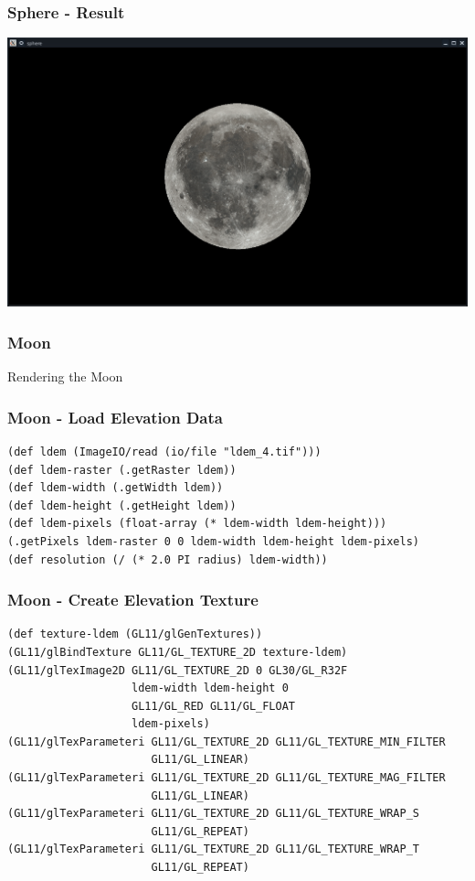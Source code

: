 \documentclass[aspectratio=169,11pt,xcolor=dvipsnames]{beamer}
\begin{document}
\begin{frame}
  \frametitle{Sphere {-} Result}
  \begin{center}
    \includegraphics[width=.8\textwidth]{sphere}
  \end{center}
\end{frame}

\begin{frame}
  \frametitle{Moon}
  \begin{center}
    \begin{huge}
      Rendering the Moon
    \end{huge}
  \end{center}
\end{frame}

\begin{frame}[fragile]
  \frametitle{Moon {-} Load Elevation Data}
  \begin{verbatim}
(def ldem (ImageIO/read (io/file "ldem_4.tif")))
(def ldem-raster (.getRaster ldem))
(def ldem-width (.getWidth ldem))
(def ldem-height (.getHeight ldem))
(def ldem-pixels (float-array (* ldem-width ldem-height)))
(.getPixels ldem-raster 0 0 ldem-width ldem-height ldem-pixels)
(def resolution (/ (* 2.0 PI radius) ldem-width))
  \end{verbatim}
\end{frame}

\begin{frame}[fragile]
  \frametitle{Moon {-} Create Elevation Texture}
  \begin{verbatim}
(def texture-ldem (GL11/glGenTextures))
(GL11/glBindTexture GL11/GL_TEXTURE_2D texture-ldem)
(GL11/glTexImage2D GL11/GL_TEXTURE_2D 0 GL30/GL_R32F
                   ldem-width ldem-height 0
                   GL11/GL_RED GL11/GL_FLOAT
                   ldem-pixels)
(GL11/glTexParameteri GL11/GL_TEXTURE_2D GL11/GL_TEXTURE_MIN_FILTER
                      GL11/GL_LINEAR)
(GL11/glTexParameteri GL11/GL_TEXTURE_2D GL11/GL_TEXTURE_MAG_FILTER
                      GL11/GL_LINEAR)
(GL11/glTexParameteri GL11/GL_TEXTURE_2D GL11/GL_TEXTURE_WRAP_S
                      GL11/GL_REPEAT)
(GL11/glTexParameteri GL11/GL_TEXTURE_2D GL11/GL_TEXTURE_WRAP_T
                      GL11/GL_REPEAT)
  \end{verbatim}
\end{frame}
\end{document}

